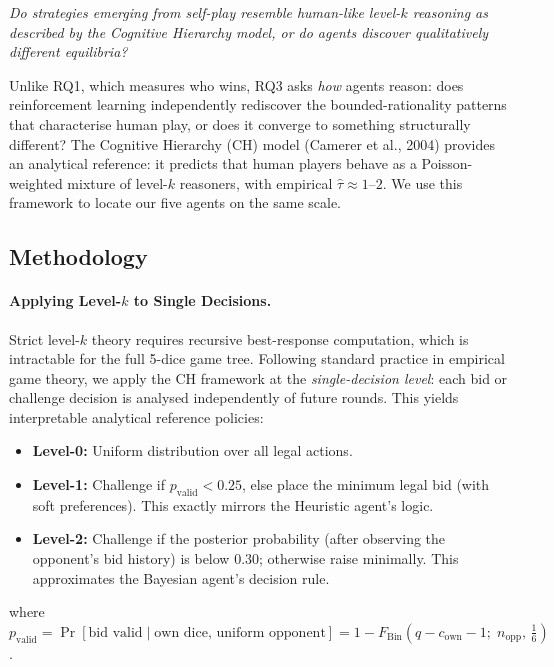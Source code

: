 \documentclass{article}
\begin{document}
\emph{Do strategies emerging from self-play resemble human-like level-$k$ reasoning as described
by the Cognitive Hierarchy model, or do agents discover qualitatively different equilibria?}

Unlike RQ1, which measures who wins, RQ3 asks \emph{how} agents reason: does reinforcement
learning independently rediscover the bounded-rationality patterns that characterise human play,
or does it converge to something structurally different? The Cognitive Hierarchy (CH) model
(Camerer et al., 2004) provides an analytical reference: it predicts that human players behave
as a Poisson-weighted mixture of level-$k$ reasoners, with empirical $\hat{\tau} \approx 1$--$2$.
We use this framework to locate our five agents on the same scale.

\subsection{Methodology}

\paragraph{Applying Level-$k$ to Single Decisions.}
Strict level-$k$ theory requires recursive best-response computation, which is intractable
for the full 5-dice game tree. Following standard practice in empirical game theory, we apply
the CH framework at the \emph{single-decision level}: each bid or challenge decision is
analysed independently of future rounds. This yields interpretable analytical reference policies:

\begin{itemize}
  \item \textbf{Level-0:} Uniform distribution over all legal actions.
  \item \textbf{Level-1:} Challenge if $p_{\text{valid}} < 0.25$, else place the minimum
        legal bid (with soft preferences).  This exactly mirrors the Heuristic agent's logic.
  \item \textbf{Level-2:} Challenge if the posterior probability (after observing the
        opponent's bid history) is below $0.30$; otherwise raise minimally.  This approximates
        the Bayesian agent's decision rule.
\end{itemize}

where $p_{\text{valid}} = \Pr[\text{bid valid} \mid \text{own dice, uniform opponent}]
= 1 - F_{\text{Bin}}(q - c_{\text{own}} - 1;\; n_{\text{opp}},\, \tfrac{1}{6})$.
\end{document}
